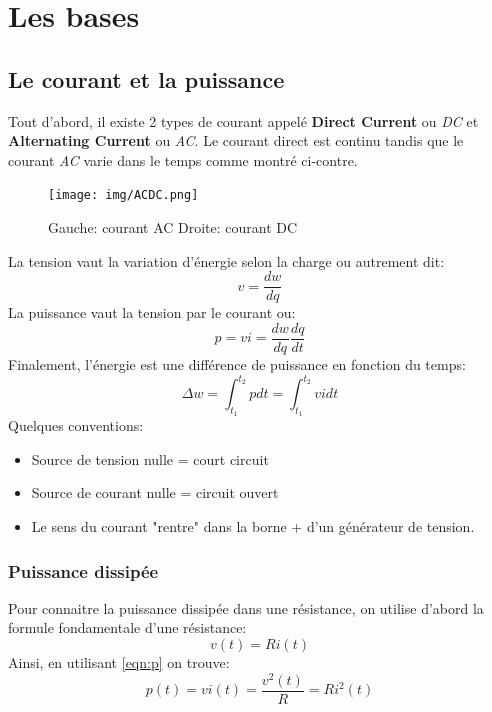 \documentclass{report}
\begin{document}
\section{Les bases}

\subsection{Le courant et la puissance}
Tout d'abord, il existe 2 types de courant appelé \textbf{Direct Current} ou \textit{DC} et \textbf{Alternating Current} ou \textit{AC}. Le courant direct est continu tandis que le courant \textit{AC} varie dans le temps comme montré ci-contre.\\
\begin{figure}[H]
	\centering
	\texttt{[image: img/ACDC.png]}
	\caption{Gauche: courant AC \quad Droite: courant DC}
\end{figure}
La tension vaut la variation d'énergie selon la charge ou autrement dit: 
\begin{equation}
v = \frac{dw}{dq}
\end{equation}
La puissance vaut la tension par le courant ou:
\begin{equation} \label{eqn:p}
p = vi = \frac{dw}{dq}\frac{dq}{dt}
\end{equation}
Finalement, l'énergie est une différence de puissance en fonction du temps:
\begin{equation}
\Delta w = \int_{t_1}^{t_2}p dt = \int_{t_1}^{t_2} vi dt
\end{equation}
Quelques conventions:
\begin{itemize}
\item Source de tension nulle = court circuit
\item Source de courant nulle = circuit ouvert
\item Le sens du courant "rentre" dans la borne + d'un générateur de tension.
\end{itemize}
\subsubsection{Puissance dissipée}
Pour connaitre la puissance dissipée dans une résistance, on utilise d'abord la formule fondamentale d'une résistance:
\begin{equation}
v(t) = R i(t)
\end{equation}
Ainsi, en utilisant \ref{eqn:p} on trouve:
\begin{equation} \label{eqn:pr}
p(t) = vi(t) = \frac{v^2(t)}{R} = Ri^2(t)
\end{equation}
\end{document}
